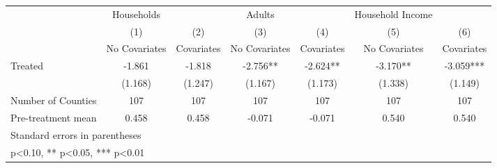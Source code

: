 {
\def\sym#1{\ifmmode^{#1}\else\(^{#1}\)\fi}
\begin{tabular}{l*{6}{c}}
\hline\hline
            &  Households   &               &      Adults   &               &Household Income   &               \\
            &\multicolumn{1}{c}{(1)}&\multicolumn{1}{c}{(2)}&\multicolumn{1}{c}{(3)}&\multicolumn{1}{c}{(4)}&\multicolumn{1}{c}{(5)}&\multicolumn{1}{c}{(6)}\\
            &\multicolumn{1}{c}{No Covariates}&\multicolumn{1}{c}{Covariates}&\multicolumn{1}{c}{No Covariates}&\multicolumn{1}{c}{Covariates}&\multicolumn{1}{c}{No Covariates}&\multicolumn{1}{c}{Covariates}\\
\hline
Treated     &      -1.861   &      -1.818   &      -2.756** &      -2.624** &      -3.170** &      -3.059***\\
            &     (1.168)   &     (1.247)   &     (1.167)   &     (1.173)   &     (1.338)   &     (1.149)   \\
\hline
Number of Counties&         107   &         107   &         107   &         107   &         107   &         107   \\
Pre-treatment mean&       0.458   &       0.458   &      -0.071   &      -0.071   &       0.540   &       0.540   \\
\hline\hline
\multicolumn{7}{l}{\footnotesize Standard errors in parentheses}\\
\multicolumn{7}{l}{\footnotesize * p<0.10, ** p<0.05, *** p<0.01}\\
\end{tabular}
}
